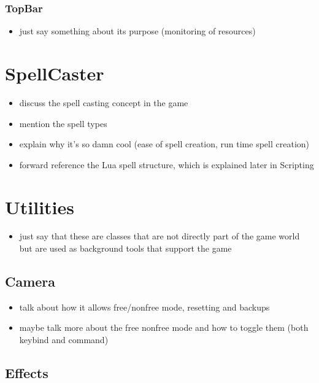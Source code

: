 \subsubsection{TopBar}

\begin{itemize}
    \item just say something about its purpose (monitoring of resources)
\end{itemize}

\section{SpellCaster}

\begin{itemize}
    \item discuss the spell casting concept in the game
    \item mention the spell types
    \item explain why it's so damn cool (ease of spell creation, run time spell creation)
    \item forward reference the Lua spell structure, which is explained later in Scripting
\end{itemize}

\section{Utilities}

\begin{itemize}
    \item just say that these are classes that are not directly part of
        the game world but are used as background tools that support the game
\end{itemize}

\subsection{Camera}

\begin{itemize}
    \item talk about how it allows free/nonfree mode, resetting
        and backups
    \item maybe talk more about the free nonfree mode and how to toggle them
        (both keybind and command)
\end{itemize}

\subsection{Effects}

